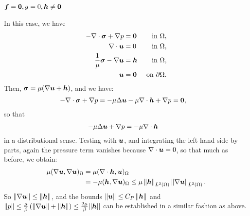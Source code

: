 \subsubsection{$\vect{f} = \vect{0},g=0,\NVRtensor{h} \neq \NVRtensor{0}$}  In this case, we have
\begin{align}
- \NVRdiv \NVRtensor{\sigma} + \NVRgrad p &= \vect{0} & \text{ in } \Omega, \label{NVR:eq:hstrongfirst} \\
\NVRdiv \vect{u} &= 0 & \text{ in } \Omega, \\
\frac{1}{\mu} \NVRtensor{\sigma} - \NVRgrad \vect{u} &= \NVRtensor{h} & \text{ in } \Omega, \\
\vect{u} &= \vect{0} & \text{ on } \partial\Omega.\label{NVR:eq:hstronglast}
\end{align}
Then, $\NVRtensor{\sigma} = \mu(\NVRgrad \vect{u} + \NVRtensor{h})$, and we have:
\begin{align*}
- \NVRdiv \NVRtensor{\sigma} + \NVRgrad p = - \mu \Delta \vect{u} - \mu \NVRdiv \NVRtensor{h} + \NVRgrad p &= \vect{0},
\end{align*}
so that
\begin{align*} - \mu \Delta \vect{u} + \NVRgrad p &= - \mu  \NVRdiv \NVRtensor{h}
\end{align*}
in a distributional sense.  Testing with $\vect{u}$, and integrating the left hand side by parts, again the pressure term vanishes because $\NVRdiv \vect{u} = 0$, so that much as before, we obtain:
\begin{align*}
\mu (\NVRgrad \vect{u}, \NVRgrad \vect{u})_{\Omega} &= \mu (\NVRdiv \NVRtensor{h}, \vect{u} )_{\Omega}\\
&= - \mu(\NVRtensor{h}, \NVRgrad \vect{u})_{\Omega} \leq \mu \norm{\NVRtensor{h}}_{L^{2}(\Omega)} \norm{ \NVRgrad \vect{u} }_{L^{2}(\Omega)}.
\end{align*}
So $\norm{\NVRgrad \vect{u}} \leq \norm{\NVRtensor{h}}$, and the bounds $\norm{\vect{u} } \leq C_{P} \norm{\NVRtensor{h}}$ and $\norm{p} \leq \frac{\mu}{\beta}\left( \norm{ \NVRgrad \vect{u} } + \norm{\NVRtensor{h}} \right) \leq \frac{2 \mu}{\beta} || \NVRtensor{h} ||$ can be established in a similar fashion as above.
